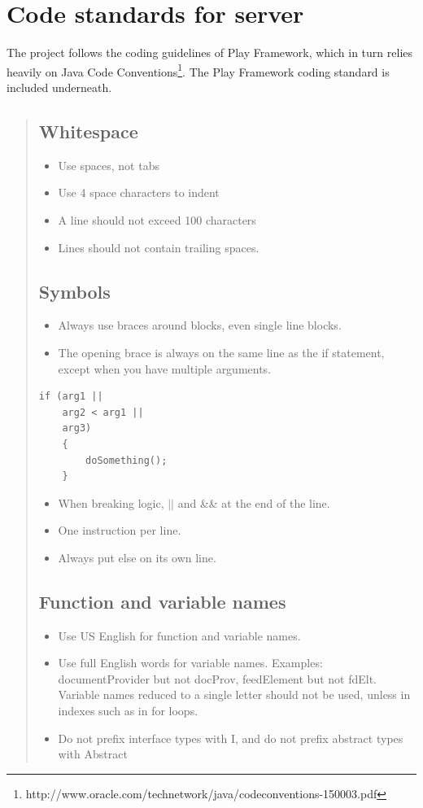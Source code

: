 \documentclass[11pt]{book}
\begin{document}
\section{Code standards for server}\label{sec:codeStandard}
The project follows the coding guidelines of Play Framework\cite{playCodingStandard}, which in turn relies heavily on Java Code Conventions\footnote{http://www.oracle.com/technetwork/java/codeconventions-150003.pdf}. The Play Framework coding standard is included underneath.

\begin{quotation}\noindent
\subsection{Whitespace}
\begin{itemize}
    \item Use spaces, not tabs
    \item Use 4 space characters to indent
    \item A line should not exceed 100 characters
    \item Lines should not contain trailing spaces.
\end{itemize}

\subsection{Symbols}
\begin{itemize}
    \item Always use braces around blocks, even single line blocks.
    \item The opening brace is always on the same line as the if statement, except when you have multiple arguments.
\end{itemize}
\lstset{language=Java}
\begin{lstlisting}[frame=single]
if (arg1 ||
    arg2 < arg1 ||
    arg3)
    {
        doSomething();
    }
\end{lstlisting}
\begin{itemize}
    \item When breaking logic, $||$ and \&\& at the end of the line.
    \item One instruction per line.
    \item Always put else on its own line.
\end{itemize}

\subsection{Function and variable names}
\begin{itemize}
    \item Use US English for function and variable names.
    \item Use full English words for variable names. Examples: documentProvider but not docProv, feedElement but not fdElt. Variable names reduced to a single letter should not be used, unless in indexes such as in for loops.
    \item Do not prefix interface types with I, and do not prefix abstract types with Abstract
\end{itemize}


\end{quotation}
\end{document}
